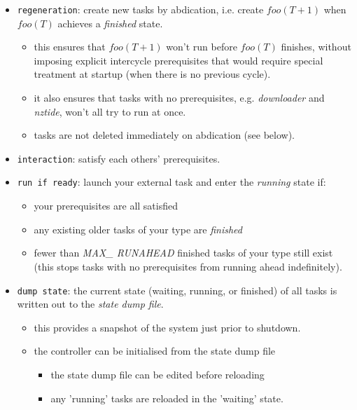 \documentclass[a4paper,12pt]{amsart}
\begin{document}
    \begin{itemize} 
    \item \verb#regeneration#: create new tasks by abdication, i.e.
    create $foo(T+1)$ when $foo(T)$ achieves a {\em finished} state.
    \begin{itemize}
    \item this ensures that $foo(T+1)$ won't run before $foo(T)$
    finishes, without imposing explicit intercycle prerequisites
    that would require special treatment at startup (when there is no
    previous cycle). 
    \item it also ensures that tasks with no prerequisites, e.g.
    {\em downloader} and {\em nztide}, won't all try to run at once.
    \item tasks are not deleted immediately on abdication (see below). 
    \end{itemize}


    \item \verb#interaction#: satisfy each others' prerequisites. 

    \item \verb#run if ready#: launch your external task and enter the
    {\em running} state if:
        \begin{itemize}
        \item your prerequisites are all satisfied
        \item any existing older tasks of your type are {\em finished} 
        \item fewer than {\em MAX\_ RUNAHEAD} finished tasks of your
        type still exist (this stops tasks with no prerequisites from
        running ahead indefinitely).
        \end{itemize}

    \item \verb#dump state#: the current state (waiting, running, or
    finished) of all tasks is written out to the {\em state dump file}.
        \begin{itemize}
        \item this provides a snapshot of the system just prior to shutdown.

        \item the controller can be initialised from the state dump file
            \begin{itemize}
            \item the state dump file can be edited before reloading

            \item any 'running' tasks are reloaded in the 'waiting' state.
            \end{itemize}
        \end{itemize}


\end{itemize}
\end{document}
